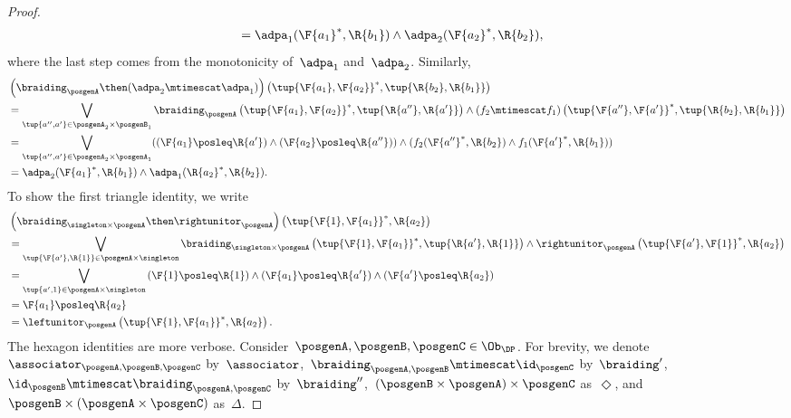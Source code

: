 \begin{proof}
\begin{equation}
\begin{aligned}
      &= \adpa_1(\F{a_1}^*,\R{b_1}) \wedge \adpa_2(\F{a_2}^*,\R{b_2}),
    \end{aligned}
  \end{equation}
  where the last step comes from the monotonicity of~$\adpa_1$ and~$\adpa_2$. Similarly,
  \begin{equation}
    \begin{aligned}
      &\left( \braiding_\posgenA \then (\adpa_2\mtimescat \adpa_1)\right)\left( \tup{\F{a_1},\F{a_2}}^*,\tup{\R{b_2},\R{b_1}}\right)\\
      &=\bigvee_{\tup{a'',a'}\in \posgenA_2\times \posgenB_1}\braiding_\posgenA\left(\tup{\F{a_1},\F{a_2}}^*,\tup{\R{a''},\R{a'}} \right)\wedge \left(f_2\mtimescat f_1\right) \left( \tup{\F{a''},\F{a'}}^*,\tup{\R{b_2},\R{b_1}}\right)\\
      &=\bigvee_{\tup{a'',a'}\in \posgenA_2\times \posgenA_1}(\left(\F{a_1}\posleq \R{a'}\right)\wedge \left(\F{a_2}\posleq \R{a''}\right)) \wedge (f_2(\F{a''}^*,\R{b_2})\wedge f_1(\F{a'}^*,\R{b_1}))\\
      &= \adpa_2(\F{a_1}^*,\R{b_1}) \wedge \adpa_1(\R{a_2}^*,\R{b_2}).
    \end{aligned}
  \end{equation}
  To show the first triangle identity, we write
  \begin{equation}
    \begin{aligned}
      &\left(\braiding_{\singleton \times \posgenA}\then \rightunitor_\posgenA\right)\left( \tup{\F{1},\F{a_1}}^*,\R{a_2}\right)\\
      &=\bigvee_{\tup{\F{a'},\R{1}}\in \posgenA\times \singleton}\braiding_{\singleton \times \posgenA}\left( \tup{\F{1},\F{a_1}}^*,\tup{\R{a'},\R{1}}\right)\wedge \rightunitor_\posgenA\left( \tup{\F{a'},\F{1}}^*,\R{a_2}\right)\\
      &=\bigvee_{\tup{a',1}\in \posgenA\times \singleton} \left(\F{1}\posleq \R{1}\right) \wedge \left(\F{a_1}\posleq \R{a'}\right)\wedge \left(\F{a'}\posleq \R{a_2}\right)\\
      &=\F{a_1}\posleq \R{a_2}\\
      &=\leftunitor_\posgenA\left( \tup{\F{1},\F{a_1}}^*,\R{a_2}\right).
    \end{aligned}
  \end{equation}
  The hexagon identities are more verbose. Consider~$\posgenA,\posgenB,\posgenC\in \Ob_\DP$.
  For brevity, we denote~$\associator_{\posgenA,\posgenB,\posgenC}$ by~$\associator$,~$\braiding_{\posgenA,\posgenB}\mtimescat \id_\posgenC$ by~$\braiding'$,~$\id_\posgenB \mtimescat \braiding_{\posgenA,\posgenC}$ by~$\braiding''$,~$(\posgenB\times \posgenA)\times \posgenC$ as~$\Diamond$, and~$\posgenB\times (\posgenA\times \posgenC)$ as~$\Delta$.

\end{proof}
